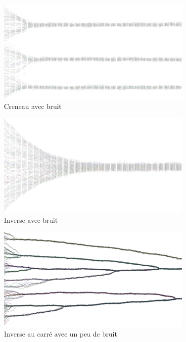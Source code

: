\documentclass[a4paper,10pt]{article}
\begin{document}
\begin{figure}[H]
\begin{center}
\includegraphics[width=270pt]{resultatCreneauBruit_inverse.png}
\end{center}
\caption{Creneau avec bruit}
\label{sim_creneau_bruit}
\end{figure}

\begin{figure}[H]
\begin{center}
\includegraphics[width=270pt]{resultatInverseBruit_inverse.png}
\end{center}
\caption{Inverse avec bruit}
\label{sim_inverse_bruit}
\end{figure}

\begin{figure}[H]
\begin{center}
\includegraphics[width=270pt]{resultatCarreBruit3_inverse.png}
\end{center}
\caption{Inverse au carré avec un peu de bruit}
\label{sim_carre_bruit_3}
\end{figure}
\end{document}
